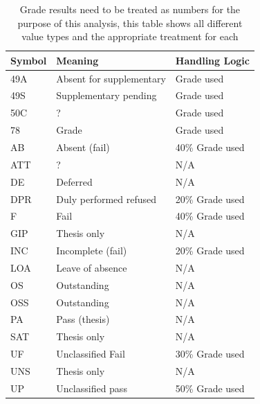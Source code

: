 \begin{table}[]
  \centering
  \caption{Grade results need to be treated as numbers for the purpose of this analysis, this table shows all different value types and the appropriate treatment for each}
  \label{PercentTreatment}
  \begin{tabular}{lll}
    Symbol & Meaning                  & Handling Logic  \\ \hline
    49A    & Absent for supplementary & Grade used      \\
    49S    & Supplementary pending    & Grade used      \\
    50C    & ?                        & Grade used      \\
    78     & Grade                    & Grade used      \\
    AB     & Absent (fail)            & 40\% Grade used \\
    ATT    & ?                        & N/A             \\
    DE     & Deferred                 & N/A             \\
    DPR    & Duly performed refused   & 20\% Grade used \\
    F      & Fail                     & 40\% Grade used \\
    GIP    & Thesis only              & N/A             \\
    INC    & Incomplete (fail)        & 20\% Grade used \\
    LOA    & Leave of absence         & N/A             \\
    OS     & Outstanding              & N/A             \\
    OSS    & Outstanding              & N/A             \\
    PA     & Pass (thesis)            & N/A             \\
    SAT    & Thesis only              & N/A             \\
    UF     & Unclassified Fail        & 30\% Grade used \\
    UNS    & Thesis only              & N/A             \\
    UP     & Unclassified pass        & 50\% Grade used \\ \hline
  \end{tabular}
\end{table}

